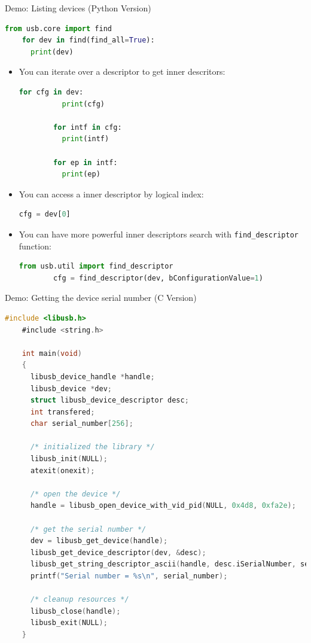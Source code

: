 \documentclass[pdf]{beamer}
\begin{document}
\begin{frame}[fragile]{Demo:  Listing devices (Python Version)}
  \tiny
  \pause
  \begin{lstlisting}[language=Python]
    from usb.core import find
    for dev in find(find_all=True):
      print(dev)
  \end{lstlisting}

  \begin{itemize}
    \tiny
    \pause
    \item You can iterate over a descriptor to get inner descritors:
      \begin{lstlisting}[language=Python]
        for cfg in dev:
          print(cfg)

        for intf in cfg:
          print(intf)

        for ep in intf:
          print(ep)
      \end{lstlisting}
    \pause
    \item You can access a inner descriptor by logical index:
      \begin{lstlisting}[language=Python]
        cfg = dev[0]
      \end{lstlisting}
    \pause
    \item You can have more powerful inner descriptors search with
      \texttt{find\_descriptor} function:
      \begin{lstlisting}[language=Python]
        from usb.util import find_descriptor
        cfg = find_descriptor(dev, bConfigurationValue=1)
      \end{lstlisting}
  \end{itemize}
\end{frame}

\begin{frame}[fragile]{Demo: Getting the device serial number (C Version)}
  \tiny
  \pause
  \begin{lstlisting}[language=C]
    #include <libusb.h>
    #include <string.h>

    int main(void)
    {
      libusb_device_handle *handle;
      libusb_device *dev;
      struct libusb_device_descriptor desc;
      int transfered;
      char serial_number[256];

      /* initialized the library */
      libusb_init(NULL);
      atexit(onexit);

      /* open the device */
      handle = libusb_open_device_with_vid_pid(NULL, 0x4d8, 0xfa2e);

      /* get the serial number */
      dev = libusb_get_device(handle);
      libusb_get_device_descriptor(dev, &desc);
      libusb_get_string_descriptor_ascii(handle, desc.iSerialNumber, serial_number, 256);
      printf("Serial number = %s\n", serial_number);

      /* cleanup resources */
      libusb_close(handle);
      libusb_exit(NULL);
    }
  \end{lstlisting}
\end{frame}
\end{document}
